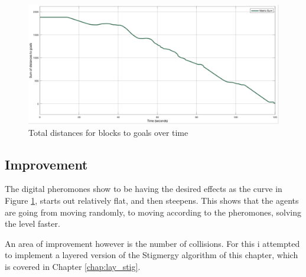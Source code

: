\begin{figure}[H]
	\centering
	\includegraphics[width=1\columnwidth]{figures/STIG_approx}
  	\caption{\label{fig:3d_stig_approx}Total distances for blocks to goals over time}
\end{figure}

\subsection{Improvement}
The digital pheromones show to be having the desired effects as the curve in Figure \ref{fig:3d_stig_approx}, starts out relatively flat, and then steepens. This shows that the agents are going from moving randomly, to moving according to the pheromones, solving the level faster. 

An area of improvement however is the number of collisions. For this i attempted to implement a layered version of the Stigmergy algorithm of this chapter, which is covered in Chapter \ref{chap:lay_stig}.

